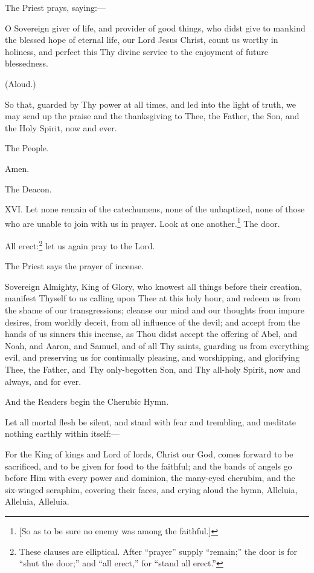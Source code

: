 The Priest prays, saying:—

O Sovereign giver of life, and provider of good things, who didst give to mankind the blessed hope of eternal life, our Lord Jesus Christ, count us worthy in holiness, and perfect this Thy divine service to the enjoyment of future blessedness.

(Aloud.)

So that, guarded by Thy power at all times, and led into the light of truth, we may send up the praise and the thanksgiving to Thee, the Father, the Son, and the Holy Spirit, now and ever.

The People.

Amen.

The Deacon.

XVI. Let none remain of the catechumens, none of the unbaptized, none of those who are unable to join with us in prayer. Look at one another.\footnote{\par{}  [So as to be sure no enemy was among the faithful.]} The door.

All erect:\footnote{\par  These clauses are elliptical. After “prayer” supply “remain;” the door is for “shut the door;” and “all erect,” for “stand all erect.”} let us again pray to the Lord.

The Priest says the prayer of incense.

Sovereign Almighty, King of Glory, who knowest all things before their creation, manifest Thyself to us calling upon Thee at this holy hour, and redeem us from the shame of our transgressions; cleanse our mind and our thoughts from impure desires, from worldly deceit, from all influence of the devil; and accept from the hands of us sinners this incense, as Thou didst accept the offering of Abel, and Noah, and Aaron, and Samuel, and of all Thy saints, guarding us from everything evil, and preserving us for continually pleasing, and worshipping, and glorifying Thee, the Father, and Thy only-begotten Son, and Thy all-holy Spirit, now and always, and for ever.

And the Readers begin the Cherubic Hymn.

Let all mortal flesh be silent, and stand with fear and trembling, and meditate nothing earthly within itself:—

For the King of kings and Lord of lords, Christ our God, comes forward to be sacrificed, and to be given for food to the faithful; and the bands of angels go before Him with every power and dominion, the many-eyed cherubim, and the six-winged seraphim, covering their faces, and crying aloud the hymn, Alleluia, Alleluia, Alleluia.

